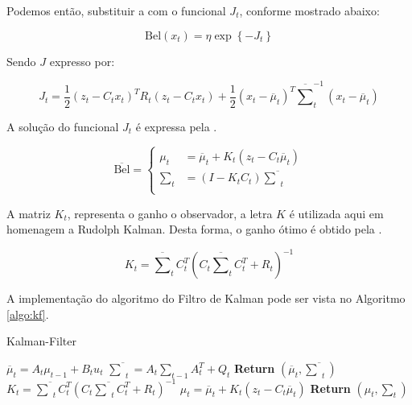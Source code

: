 Podemos então, substituir a  com o funcional $J_t$, conforme mostrado abaixo:

\begin{equation}
    \text{Bel}(x_t)  = \eta  \exp\left\{-J_t\right\}
\end{equation}

Sendo $J$ expresso por:

\begin{equation}
    J_t = \displaystyle\frac{1}{2} \left(z_t - C_t x_t\right)^T R_t \left(z_t - C_t x_t\right)  +
    \displaystyle\frac{1}{2} \left(x_t - \overline{\mu}_t\right)^T \overline{\textstyle\sum}_t^{-1} \left(x_t - \overline{\mu}_t\right)
\end{equation}

A solução do funcional $J_t$ é expressa pela .

\begin{equation}
    \label{eq:bayes14}
    \overline{\text{Bel}} = 
    \left\{
    \begin{aligned}
            \mu_t & = \overline{\mu}_t + K_t(z_t -C_t \overline{\mu}_t)\\
            \textstyle\sum_t & = (I-K_tC_t)\overline{\textstyle\sum}_t \\
    \end{aligned} \right.
\end{equation}

A matriz $K_t$, representa o ganho o observador, a letra $K$ é utilizada aqui em homenagem a Rudolph Kalman. Desta forma, o ganho ótimo é obtido pela .

\begin{equation}
    \label{eq:bayes15}
    K_t = \overline{\textstyle\sum}_tC_t^T(C_t\overline{\textstyle\sum}_tC_t^T+R_t)^{-1}
\end{equation}

A implementação do algoritmo do Filtro de Kalman pode ser vista no Algoritmo \ref{algo:kf}.

\begin{algorithm}[H]
    \caption{Kalman-Filter}
    \begin{algorithmic}[1]
        \State $\overline{\mu}_t = A_t\mu_{t-1} + B_t u_t$
        \State $ \overline{\textstyle\sum}_t = A_t {\textstyle\sum}_{t-1} A_t^T+ Q_t$ 
        \State \textbf{Return} $\left(\overline{\mu}_t, \overline{\textstyle\sum}_t\right)$
    \EndProcedure
        \State $K_t = \overline{\textstyle\sum}_tC_t^T(C_t\overline{\textstyle\sum}_tC_t^T+R_t)^{-1}$
        \State $\mu_t  = \overline{\mu}_t + K_t(z_t -C_t\overline\mu_t)$
        \State \textbf{Return} $\left(\mu_t, \textstyle\sum_t\right)$
    \EndProcedure
    \end{algorithmic}
    \label{algo:kf}
\end{algorithm}

